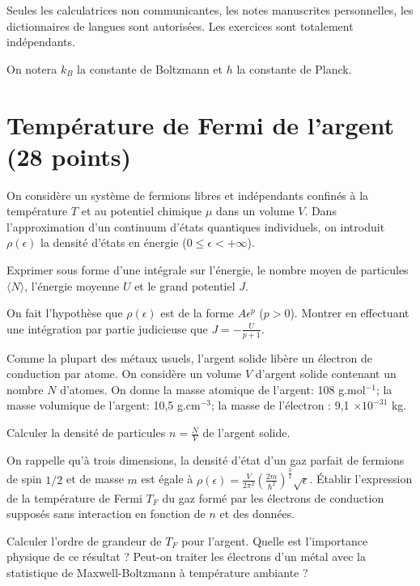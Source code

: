 \documentclass[utf8, 11pt]{feuille}
\begin{document}
Seules les calculatrices non communicantes, les notes manuscrites personnelles, les dictionnaires de langues sont autorisées. Les exercices sont totalement indépendants. 

On notera $k_B$ la constante de Boltzmann et $h$ la constante de Planck.





\section{Température de Fermi de l'argent (28 points)}

On considère un système de fermions libres et indépendants confinés à la température $T$ et au potentiel chimique $\mu$ dans un volume $V$. Dans l'approximation d'un continuum d'états quantiques individuels, on introduit $\rho(\epsilon)$ la densité d'états en énergie ($0\le \epsilon < +\infty$).

\question Exprimer sous forme d'une intégrale sur l'énergie, le nombre moyen de particules $\langle N \rangle$, l'énergie moyenne $U$ et le grand potentiel $J$.

\question On fait l'hypothèse que $\rho(\epsilon)$ est de la forme $A\epsilon^p$ ($p >0$). Montrer en effectuant une intégration par partie judicieuse que $J=-\frac{U}{p+1}$.

Comme la plupart des métaux usuels, l’argent solide libère un électron de conduction par atome. On considère un volume $V$ d’argent solide contenant un nombre $N$ d’atomes. On donne la masse atomique de l'argent: 108 g.mol$^{-1}$; la masse volumique de l'argent: 10,5 g.cm$^{-3}$; la masse de l'électron : 9,1 $\times 10^{-31}$ kg.

\question Calculer la densité de particules $n=\frac{N}{V}$ de l'argent solide.


\question On rappelle qu'à trois dimensions, la densité d'état d'un gaz parfait de fermions de spin $1/2$ et de masse $m$ est égale à $\rho(\epsilon)=\frac{V}{2\pi^2}(\frac{2 m}{\hbar^2})^{\frac{3}{2}} \sqrt{\epsilon}$. \'Etablir l’expression de la température de Fermi $T_F$ du gaz formé par les électrons de conduction supposés sans interaction en fonction de $n$ et des données. 

\question Calculer l’ordre de grandeur de $T_F$ pour l’argent. Quelle est l’importance physique de ce résultat ?  Peut-on traiter les électrons d'un métal avec la statistique de Maxwell-Boltzmann à température ambiante ?
\end{document}
